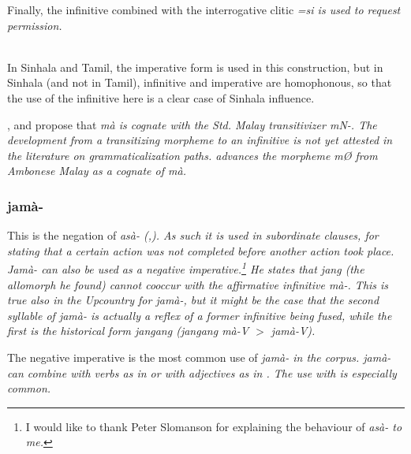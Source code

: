 Finally, the infinitive combined with the interrogative clitic \em =si \em is used to request permission.

 \\
In Sinhala and Tamil, the imperative form is used in this construction, but in Sinhala (and not in Tamil), infinitive and imperative are homophonous, so that the use of the infinitive here is a clear case of Sinhala influence.

\citet{Saldin1996},\citet[173]{SmithEtAl2007} and \citet[29]{Ansaldo2008genesis} propose that \em mà \em is cognate with the Std. Malay transitivizer \em m\E N-\em. The development from a transitizing morpheme to an infinitive is not yet attested in the literature on grammaticalization paths. \citet{Slomanson2007cll}  advances the morpheme \em m\O{} \em  from Ambonese Malay as a cognate of \em mà\em.
\subsubsection{jamà-}\label{sec:morph:jama-}
This is the negation of \em asà- \em   (\citet[cf.][147]{Slomanson2007cll},\citet[cf.][]{Slomanson2008lingua}). As such it is used in subordinate clauses, for stating that a certain action was not completed before another action took place. \em Jamà- \em can also be used as a negative imperative.\footnote{I would like to thank Peter Slomanson for explaining the behaviour of \em asà- \em to me.} He states that \em jang \em (the allomorph he found) cannot cooccur with the affirmative infinitive \em mà-\em. This is true also in the Upcountry for \em jamà-\em, but it might be the case that the second syllable of \em jamà- \em is actually a reflex of a former infinitive being fused, while the first is the historical form \em jangang \em (\em jangang mà-V $>$ jamà-V\em).

The negative imperative is the most common use of \em jamà- \em in the corpus. \em jamà- \em can combine with verbs as in  or with adjectives as in . The use with  is especially common.

